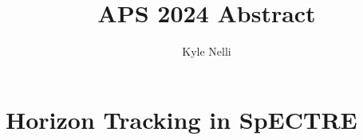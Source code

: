 \documentclass[12pt]{article}
\title{APS 2024 Abstract}
\author{Kyle Nelli}
\begin{document}
\maketitle

\section*{Horizon Tracking in SpECTRE}
\end{document}

